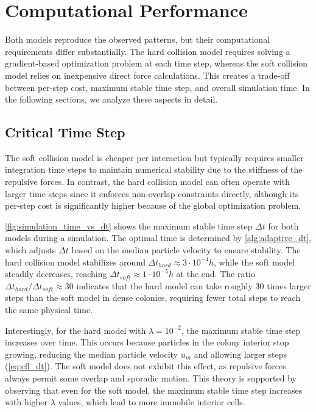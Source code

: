 \documentclass[conference]{IEEEtran}
\begin{document}
\clearpage
\newpage

\section{Computational Performance}

Both models reproduce the observed patterns, but their computational requirements differ substantially. The hard collision model requires solving a gradient-based optimization problem at each time step, whereas the soft collision model relies on inexpensive direct force calculations. This creates a trade-off between per-step cost, maximum stable time step, and overall simulation time. In the following sections, we analyze these aspects in detail.

\subsection{Critical Time Step}

The soft collision model is cheaper per interaction but typically requires smaller integration time steps to maintain numerical stability due to the stiffness of the repulsive forces. In contrast, the hard collision model can often operate with larger time steps since it enforces non-overlap constraints directly, although its per-step cost is significantly higher because of the global optimization problem.

\autoref{fig:simulation_time_vs_dt} shows the maximum stable time step $\Delta t$ for both models during a simulation. The optimal time is determined by \autoref{alg:adaptive_dt}, which adjusts $\Delta t$ based on the median particle velocity to ensure stability. The hard collision model stabilizes around ${\Delta t}_{hard} \approx 3 \cdot 10^{-4} h$, while the soft model steadily decreases, reaching ${\Delta t}_{soft} \approx 1 \cdot 10^{-5} h$ at the end. The ratio ${\Delta t}_{hard}/{\Delta t}_{soft} \approx 30$ indicates that the hard model can take roughly 30 times larger steps than the soft model in dense colonies, requiring fewer total steps to reach the same physical time.

Interestingly, for the hard model with $\lambda=10^{-2}$, the maximum stable time step increases over time. This occurs because particles in the colony interior stop growing, reducing the median particle velocity $u_m$ and allowing larger steps (\autoref{eq:cfl_dt}). The soft model does not exhibit this effect, as repulsive forces always permit some overlap and sporadic motion. This theory is supported by observing that even for the soft model, the maximum stable time step increases with higher $\lambda$ values, which lead to more immobile interior cells.
\end{document}
